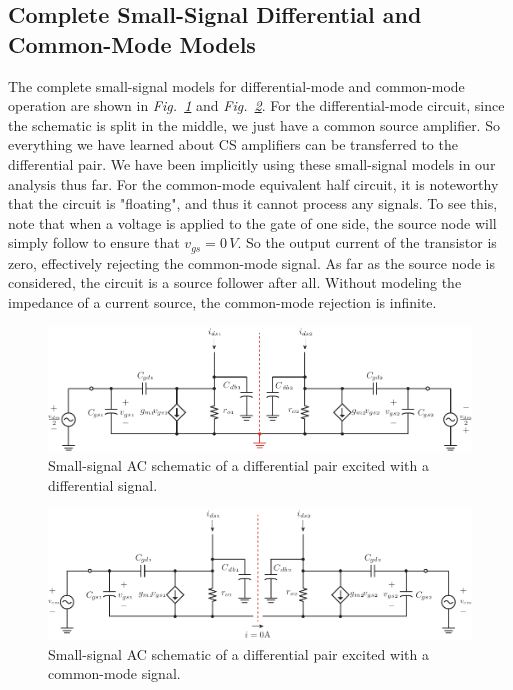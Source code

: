\subsection{Complete Small-Signal Differential and Common-Mode Models}
The complete small-signal models for differential-mode and common-mode operation are shown in \emph{Fig.~\ref{fig:DM_symmetry_small_signal}} and \emph{Fig.~\ref{fig:CM_symmetry_small_signal}}.  For the differential-mode circuit, since the schematic is split in the middle, we just have a common source amplifier.  So everything we have learned about CS amplifiers can be transferred to the differential pair.  We have been implicitly using these small-signal models in our analysis thus far.  For the common-mode equivalent half circuit, it is noteworthy that the circuit is "floating", and thus it cannot process any signals.  To see this, note that when a voltage is applied to the gate of one side, the source node will simply follow to ensure that $v_{gs} = 0\,V$.  So the output current of the transistor is zero, effectively rejecting the common-mode signal.  As far as the source node is considered, the circuit is a source follower after all.  Without modeling the impedance of a current source, the common-mode rejection is infinite.
\begin{figure}[H]
\centering
\includegraphics[width=\columnwidth]{DM_symmetry_small_signal}
\caption{Small-signal AC schematic of a differential pair excited with a differential signal.}
\label{fig:DM_symmetry_small_signal}
\end{figure}
\begin{figure}[H]
\centering
\includegraphics[width=\columnwidth]{CM_symmetry_small_signal}
\caption{Small-signal AC schematic of a differential pair excited with a common-mode signal.}
\label{fig:CM_symmetry_small_signal}
\end{figure}
